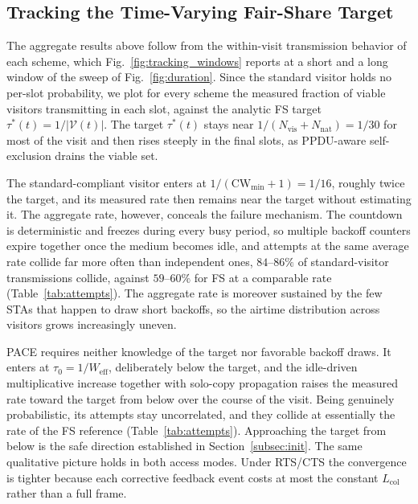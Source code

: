\documentclass[journal,10pt]{IEEEtran}
\newcommand{\Nvis}{N_\mathrm{vis}}
\newcommand{\Nnat}{N_\mathrm{nat}}
\begin{document}
\subsection{Tracking the Time-Varying Fair-Share Target}
\label{subsec:eval_tracking}

The aggregate results above follow from the within-visit transmission
behavior of each scheme, which Fig.~\ref{fig:tracking_windows} reports
at a short and a long window of the sweep of
Fig.~\ref{fig:duration}. Since
the standard visitor holds no per-slot probability, we plot for every
scheme the measured fraction of viable visitors transmitting in each
slot, against the analytic FS target
$\tau^*(t)=1/|\mathcal{V}(t)|$. The target $\tau^*(t)$ stays near $1/(\Nvis{+}\Nnat)=1/30$
for most of the visit and then rises steeply in the final slots, as
PPDU-aware self-exclusion drains the viable
set. 

The standard-compliant visitor enters at $1/(\mathrm{CW}_{\min}{+}1)=1/16$,
roughly twice the target, and its measured rate then remains near the
target without estimating it. The aggregate rate, however, conceals
the failure mechanism. The countdown is deterministic and freezes during every busy
period, so multiple backoff counters expire together once the medium
becomes idle, and attempts at the same average rate collide far more
often than independent ones, $84$--$86\%$ of standard-visitor transmissions
collide, against $59$--$60\%$ for FS at a comparable rate
(Table~\ref{tab:attempts}). The aggregate rate is moreover
sustained by the few STAs that happen to draw short backoffs, so the
airtime distribution across visitors grows increasingly uneven.

PACE requires neither knowledge of the target nor favorable backoff
draws. It enters at
$\tau_0=1/W_\mathrm{eff}$, deliberately below the target, and the
idle-driven multiplicative increase together with solo-copy propagation
raises the measured rate toward the target from below over the
course of the visit. Being genuinely probabilistic, its attempts
stay uncorrelated, and they collide at essentially the rate of the FS
reference (Table~\ref{tab:attempts}). Approaching the
target from below is the safe direction established in
Section~\ref{subsec:init}. The same qualitative picture holds
in both access modes. Under RTS/CTS the convergence is tighter because
each corrective feedback event costs at most the constant
$L_\mathrm{col}$ rather than a full frame.
\end{document}
